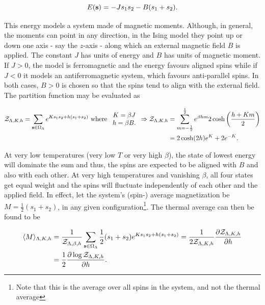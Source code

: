 \documentclass{homework}
\begin{document}
\begin{equation}
    E({\bf s}) = - J s_1 s_2 - B(s_1+s_2).
\end{equation}

This energy models a system made of magnetic moments. Although, in general, the moments can point in any direction, in the Ising model they point up or down one axis - say the $z$-axis - along which an external magnetic field $B$ is applied. The constant $J$ has units of energy and $B$ has units of magnetic moment. If $J>0$, the model is ferromagnetic and the energy favours aligned spins while if $J<0$ it models an antiferromagnetic system, which favours anti-parallel spins. In both cases, $B>0$ is chosen so that the spins tend to align with the external field. \\

The partition function may be evaluated as 

\begin{equation} \begin{split}
    \mathcal{Z}_{\Lambda, K, h} = \sum_{{\bf s} \in \Omega_{\Lambda}} e^{K s_1 s_2 + h(s_1+s_2)} \textnormal{ where } \begin{array}{c}
         K = \beta J  \\
         h = \beta B.
    \end{array} \Rightarrow
    \mathcal{Z}_{\Lambda, K, h} &= \sum_{m=-\frac{1}{2}}^{\frac{1}{2}} e^{\beta h m} 2 \cosh\bigg(\frac{h + Km}{2}\bigg) \\
    &= 2 \cosh(2h) e^{K} + 2e^{-K}.
    \end{split}
\end{equation}

At very low temperatures (very low $T$ or very high $\beta$), the state of lowest energy will dominate the sum and thus, the spins are expected to be aligned with $B$ and also with each other. At very high temperatures and vanishing $\beta$, all four states get equal weight and the spins will fluctuate independently of each other and the applied field. In effect, let the system's (spin-) average magnetization be $M = \frac{1}{2} (s_1+s_2)$, in any given configuration\footnote{Note that this is the average over all spins in the system, and not the thermal average}. The thermal average can then be found to be 

\begin{equation}
    \begin{split}
        \langle M \rangle_{\Lambda, K, h} &= \frac{1}{ \mathcal{Z}_{\Lambda, \beta, h}} \sum_{{\bf s} \in \Omega_\Lambda} \frac{1}{2} (s_1+s_2) e^{K s_1 s_2 + h(s_1+s_2)} = \frac{1}{2 \mathcal{Z}_{\Lambda, K, h} }\frac{\partial  \mathcal{Z}_{\Lambda, K, h} }{\partial h} \\
        &= \frac{1}{2} \frac{\partial \log  \mathcal{Z}_{\Lambda, K, h}}{\partial h}.
    \end{split}
\end{equation}
\end{document}
